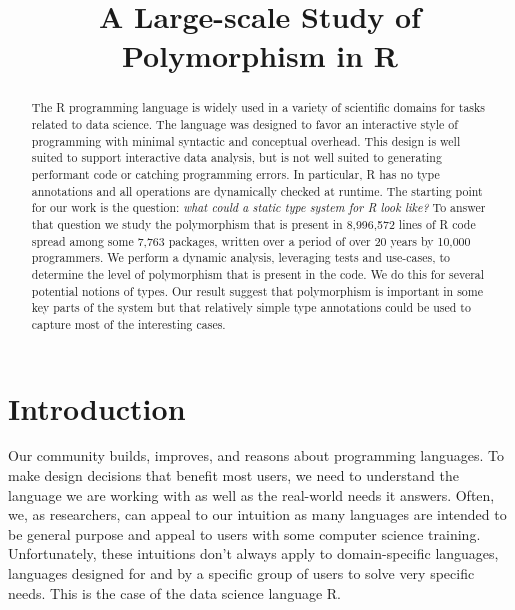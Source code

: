 \documentclass[acmsmall,10pt,review,anonymous]{acmart}\settopmatter{printfolios=true,printccs=false,printacmref=false}
\begin{document}
\title{A Large-scale Study of Polymorphism in R}

\newcommand{\PACKAGES}{7,763\xspace}
\newcommand{\PROGRAMMERS}{10,000\xspace}
\newcommand{\PERCENTCRAN}{56\%\xspace}
\newcommand{\CRANTOTAL}{13,841\xspace}
\newcommand{\RLOC}{8,996,572\xspace}
\newcommand{\YEARS}{20\xspace}

\begin{abstract}
The R programming language is widely used in a variety of scientific domains
for tasks related to data science. The language was designed to favor an
interactive style of programming with minimal syntactic and conceptual
overhead. This design is well suited to support interactive data analysis,
but is not well suited to generating performant code or catching programming
errors.  In particular, R has no type annotations and all operations are
dynamically checked at runtime. The starting point for our work is the
question: \emph{what could a static type system for R look like?}  To answer
that question we study the polymorphism that is present in \RLOC lines of R 
code spread among some \PACKAGES packages, written over a
period of over \YEARS years by \PROGRAMMERS programmers.  We perform a dynamic
analysis, leveraging tests and use-cases, to determine the level of
polymorphism that is present in the code. We do this for several potential
notions of types. Our result suggest that polymorphism is important in some
key parts of the system but that relatively simple type annotations could be
used to capture most of the interesting cases.
\end{abstract}

\maketitle

\section{Introduction}

Our community builds, improves, and reasons about programming languages.  To
make design decisions that benefit most users, we need to understand the
language we are working with as well as the real-world needs it
answers. Often, we, as researchers, can appeal to our intuition as many
languages are intended to be general purpose and appeal to users with some
computer science training. Unfortunately, these intuitions don't always
apply to domain-specific languages, languages designed for and by a specific
group of users to solve very specific needs. This is the case of the data
science language R.
\end{document}
